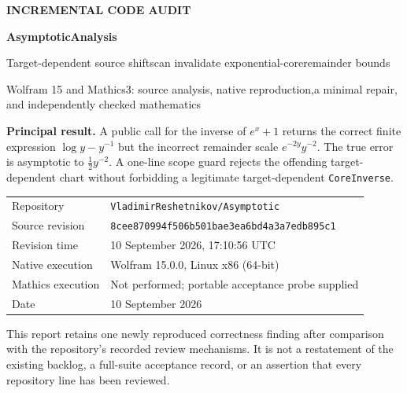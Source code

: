 \documentclass[11pt,letterpaper]{article}
\newcommand{\code}[1]{\texttt{#1}}
\newcommand{\revision}{\texttt{8cee870994f506b501bae3ea6bd4a3a7edb895c1}}
\begin{document}
\begin{titlepage}
\vspace*{0.5in}
{\color{teal}\sffamily\bfseries INCREMENTAL CODE AUDIT\par}
\vspace{0.35in}
{\color{navy}\sffamily\bfseries\fontsize{30}{35}\selectfont AsymptoticAnalysis\par}
\vspace{0.22in}
{\sffamily\fontsize{21}{27}\selectfont Target-dependent source shifts\newline can invalidate exponential-core\newline remainder bounds\par}
\vspace{0.35in}
{\large Wolfram 15 and Mathics3: source analysis, native reproduction,\newline a minimal repair, and independently checked mathematics\par}
\vspace{0.45in}
\colorbox{pale}{\parbox{0.94\textwidth}{\vspace{10pt}
\textbf{Principal result.} A public call for the inverse of $e^x+1$ returns the correct finite expression $\log y-y^{-1}$ but the incorrect remainder scale $e^{-2y}y^{-2}$. The true error is asymptotic to $\tfrac12y^{-2}$. A one-line scope guard rejects the offending target-dependent chart without forbidding a legitimate target-dependent \code{CoreInverse}.\vspace{10pt}}}
\vfill
\begin{tabular}{@{}ll@{}}
Repository & \code{VladimirReshetnikov/Asymptotic}\\
Source revision & \revision\\
Revision time & 10 September 2026, 17:10:56 UTC\\
Native execution & Wolfram 15.0.0, Linux x86 (64-bit)\\
Mathics execution & Not performed; portable acceptance probe supplied\\
Date & 10 September 2026
\end{tabular}
\vspace{0.3in}
{\small This report retains one newly reproduced correctness finding after comparison with the repository's recorded review mechanisms. It is not a restatement of the existing backlog, a full-suite acceptance record, or an assertion that every repository line has been reviewed.}
\end{titlepage}
\end{document}
